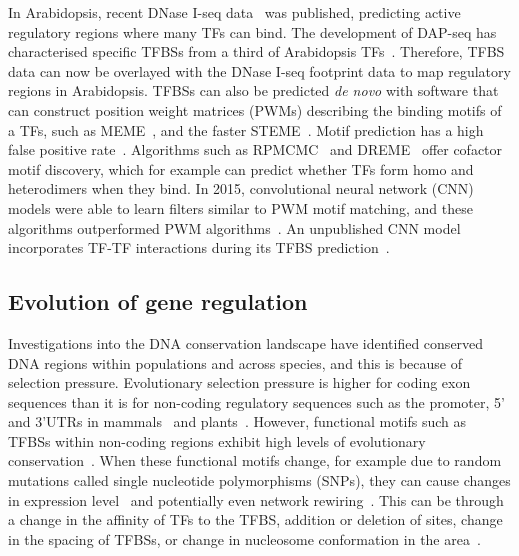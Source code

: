 In Arabidopsis, recent DNase I\hyp{}seq data~\autocite{sullivanMappingDynamicsRegulatory2014} was published, predicting active regulatory regions where many TFs can bind.
The development of DAP\hyp{}seq has characterised specific TFBSs from a third of Arabidopsis TFs~\autocite{omalleyCistromeEpicistromeFeatures2016}.
Therefore, TFBS data can now be overlayed with the DNase I\hyp{}seq footprint data to map regulatory regions in Arabidopsis.
TFBSs can also be predicted \textit{de novo} with software that can construct position weight matrices (PWMs) describing the binding motifs of a TFs, such as MEME~\autocite{baileyFittingMixtureModel1994}, and the faster STEME~\autocite{reidSTEMEEfficientEM2011}.
Motif prediction has a high false positive rate~\autocite{zambelliMotifDiscoveryTranscription2013}.
Algorithms such as RPMCMC~\autocite{ikebataRepulsiveParallelMCMC2015} and DREME~\autocite{baileyDREMEMotifDiscovery2011} offer cofactor motif discovery, which for example can predict whether TFs form homo and heterodimers when they bind.
In 2015, convolutional neural network (CNN) models were able to learn filters similar to PWM motif matching, and these algorithms outperformed PWM algorithms~\autocite{alipanahiPredictingSequenceSpecificities2015}.
An unpublished CNN model incorporates TF\hyp{}TF interactions during its TFBS prediction~\autocite{lanchantinPrototypeMatchingNetworks2017}.

\subsection{Evolution of gene regulation}
{\label{evolution-of-gene-regulation}}

Investigations into the DNA conservation landscape have identified
conserved DNA regions within populations and across species, and this is
because of selection pressure. Evolutionary selection pressure is higher
for coding exon sequences than it is for non\hyp{}coding regulatory sequences
such as the promoter, 5' and 3'UTRs in mammals~\autocite{lindblad-tohHighresolutionMapHuman2011} and
plants~\autocite{haudryAtlas900002013}. However, functional motifs such as TFBSs
within non\hyp{}coding regions exhibit high levels of evolutionary
conservation~\autocite{zhaoConservedMotifsPrediction2012}. When these functional motifs change,
for example due to random mutations called single nucleotide
polymorphisms (SNPs), they can cause changes in expression
level~\autocite{rockmanAbundantRawMaterial2002} and potentially even network
rewiring~\autocite{liEvolutionTranscriptionNetworks2010}. This can be through a change in the
affinity of TFs to the TFBS, addition or deletion of sites, change in
the spacing of TFBSs, or change in nucleosome conformation in the area~\autocite{fyonEnhancerRunawayEvolution2015}.

